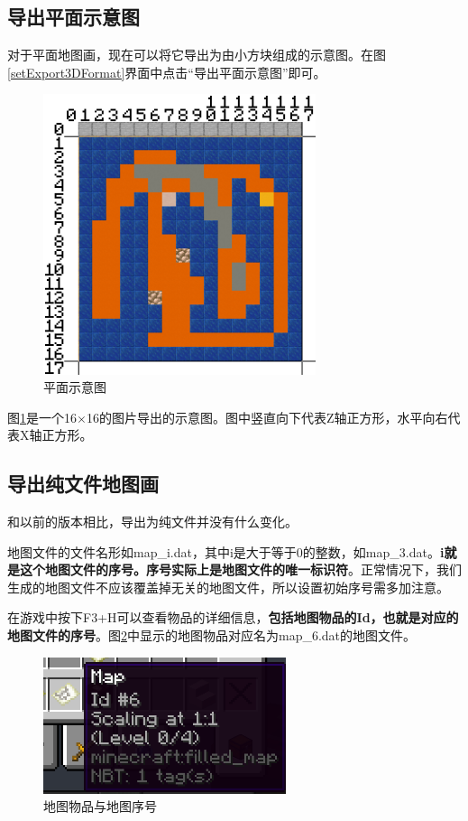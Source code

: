 \documentclass[UTF8]{ctexart}
\begin{document}
\subsection{导出平面示意图}
对于平面地图画，现在可以将它导出为由小方块组成的示意图。在图\ref*{setExport3DFormat}界面中点击“导出平面示意图”即可。
\begin{figure}[htbp]
    \centering
    \includegraphics[width=8cm]{Img14_FlatDiagram.png}
    \caption{平面示意图}
    \label{flatDiagram}
\end{figure}
图\ref*{flatDiagram}是一个16$\times$16的图片导出的示意图。图中竖直向下代表Z轴正方形，水平向右代表X轴正方形。

\subsection{导出纯文件地图画}
和以前的版本相比，导出为纯文件并没有什么变化。

地图文件的文件名形如map\_i.dat，其中i是大于等于0的整数，如map\_3.dat。\textbf{i就是这个地图文件的序号。序号实际上是地图文件的唯一标识符}。正常情况下，我们生成的地图文件不应该覆盖掉无关的地图文件，所以设置初始序号需多加注意。

在游戏中按下F3+H可以查看物品的详细信息，\textbf{包括地图物品的Id，也就是对应的地图文件的序号}。图\ref*{mapItem}中显示的地图物品对应名为map\_6.dat的地图文件。
\begin{figure}[htbp]
    \centering
    \includegraphics[height=4cm]{Img8_MapItem.png}
    \caption{地图物品与地图序号}
    \label{mapItem}
\end{figure}
\end{document}
